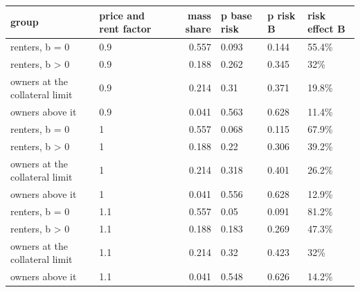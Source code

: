 \begingroup\small
\setlength{\tabcolsep}{3pt}
\renewcommand{\arraystretch}{1.04}
\begin{tabularx}{\linewidth}{XXrXXX}
\toprule
group & price and rent factor & mass share & p base risk & p risk B & risk effect B \\
\midrule
renters, b = 0 & 0.9 & 0.557 & 0.093 & 0.144 & 55.4\% \\
renters, b \textgreater{} 0 & 0.9 & 0.188 & 0.262 & 0.345 & 32\% \\
owners at the collateral limit & 0.9 & 0.214 & 0.31 & 0.371 & 19.8\% \\
owners above it & 0.9 & 0.041 & 0.563 & 0.628 & 11.4\% \\
renters, b = 0 & 1 & 0.557 & 0.068 & 0.115 & 67.9\% \\
renters, b \textgreater{} 0 & 1 & 0.188 & 0.22 & 0.306 & 39.2\% \\
owners at the collateral limit & 1 & 0.214 & 0.318 & 0.401 & 26.2\% \\
owners above it & 1 & 0.041 & 0.556 & 0.628 & 12.9\% \\
renters, b = 0 & 1.1 & 0.557 & 0.05 & 0.091 & 81.2\% \\
renters, b \textgreater{} 0 & 1.1 & 0.188 & 0.183 & 0.269 & 47.3\% \\
owners at the collateral limit & 1.1 & 0.214 & 0.32 & 0.423 & 32\% \\
owners above it & 1.1 & 0.041 & 0.548 & 0.626 & 14.2\% \\
\bottomrule
\end{tabularx}
\endgroup
